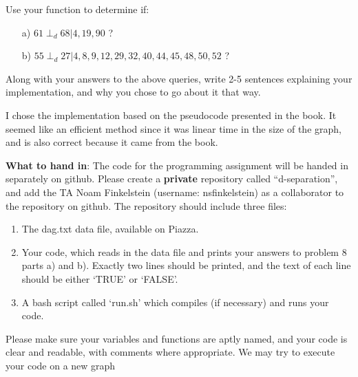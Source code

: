 \documentclass[letterpaper]{article}
\begin{document}
Use your function to determine if:
\begin{itemize}
  \item[a)]  $61 \perp_d 68 | 4,19,90$ ?
\item[b)] $55 \perp_d 27 | 4,8,9,12,29,32,40,44,45,48,50,52$ ?
\end{itemize}
Along with your answers to the above queries, write 2-5 sentences explaining your implementation, and why you chose to go about it that way. \\ [3ex]
      \begin{answer*}
	I chose the implementation based on the pseudocode presented in the book. It seemed like an efficient method since it was linear time in the size of the graph, and is also correct because it came from the book. 
      \end{answer*}

\textbf{What to hand in}: The code for the programming assignment will be handed in separately on
github. Please create a {\bf private} repository called ``d-separation'',
and add the TA Noam Finkelstein (username: nsfinkelstein) as a collaborator to the repository on
github. The repository should include three files:

\begin{enumerate}
  \item The dag.txt data file, available on Piazza.
  \item Your code, which reads in the data file and prints your answers to
problem 8 parts a) and b). Exactly two lines should be printed, and the text
of each line should be either `TRUE' or `FALSE'.
	\item A bash script called `run.sh' which compiles (if necessary) and runs
	  your code.
      \end{enumerate}

      Please make sure your variables and functions are aptly named, and your code
      is clear and readable, with comments where appropriate. We may try to execute your code on a new graph


      
\end{document}
